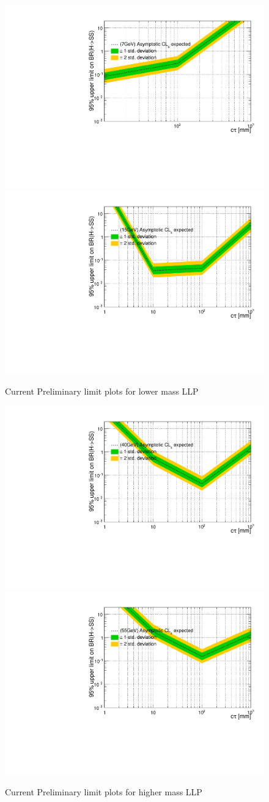 \begin{figure}[h!]
   \caption{Current Preliminary limit plots for lower mass LLP}
   \label{fig:Limit}
   \centering
   \includegraphics[width=0.48\linewidth]{figs/7GeVUpperLimit.pdf}
   \includegraphics[width=0.48\linewidth]{figs/15GeVUpperLimit.pdf}
 \end{figure}
 \begin{figure}[h!]
   \caption{Current Preliminary limit plots for higher mass LLP}
   \label{fig:Limit2}
   \centering
   \includegraphics[width=0.48\linewidth]{figs/40GeVUpperLimit.pdf}
   \includegraphics[width=0.48\linewidth]{figs/55GeVUpperLimit.pdf}
 \end{figure}
